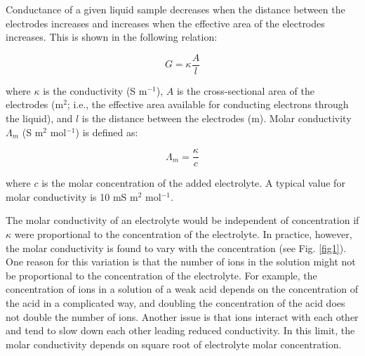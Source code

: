 \documentclass[byrevtex,amssymb,aps,pra,floatfix,letterpaper]{revtex4}
\begin{document}
\noindent
Conductance of a given liquid sample decreases when the distance between the electrodes increases and increases when the effective area of the electrodes increases. This is shown in the following relation:

\begin{equation}
G = \kappa\frac{A}{l}
\label{eq3}
\end{equation}

\noindent
where $\kappa$ is the conductivity (S m$^{-1}$), $A$ is the cross-sectional area of the electrodes (m$^2$; i.e., the effective area available for conducting electrons through the liquid), and $l$ is the distance between the electrodes (m). Molar conductivity $\Lambda_m$ (S m$^2$ mol$^{-1}$) is defined as:

\begin{equation}
\Lambda_m = \frac{\kappa}{c}
\label{eq4}
\end{equation}

\noindent
where $c$ is the molar concentration of the added electrolyte. A typical value for molar conductivity is 10 mS m$^2$ mol$^{-1}$.

The molar conductivity of an electrolyte would be independent of concentration if $\kappa$ were proportional to the concentration of the electrolyte. In practice, however, the molar conductivity is found to vary with the concentration (see Fig. \ref{fig1}). One reason for this variation is that the number of ions in the solution might not be proportional to the concentration of the electrolyte. For example, the concentration of ions in a solution of a weak acid depends on the concentration of the acid in a complicated way, and doubling the concentration of the acid does not double the number of ions. Another issue is that ions interact with each other and tend to slow down each other leading reduced conductivity. In this limit, the molar conductivity depends on square root of electrolyte molar concentration.
\end{document}
